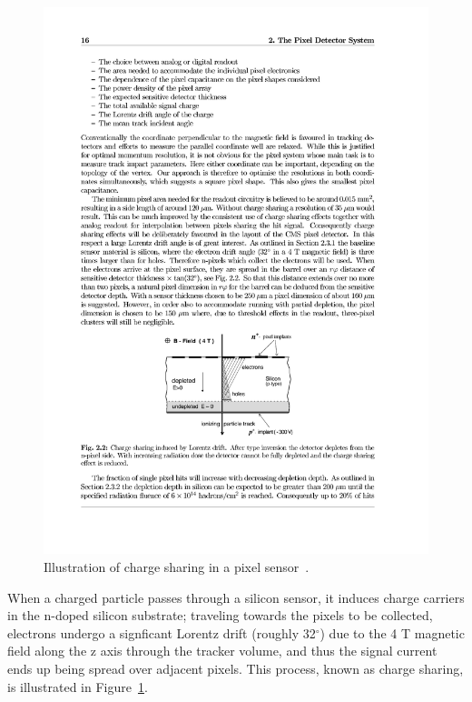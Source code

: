 \begin{figure}[hbtp]
  \begin{center}
    \includegraphics[width=1.24\cmsFigWidth]{figures/cms-pixel-chargesharing}
    \caption{Illustration of charge sharing in a pixel sensor~\cite{Dominguez:1481838}.}
    \label{fig:cms-pixel-chargesharing}
  \end{center}
\end{figure}

When a charged particle passes through a silicon sensor, it induces charge carriers in the n-doped silicon substrate; traveling towards the pixels to be collected, electrons undergo a signficant Lorentz drift (roughly 32$^{\circ}$) due to the 4 T magnetic field along the z axis through the tracker volume, and thus the signal current ends up being spread over adjacent pixels. This process, known as charge sharing, is illustrated in Figure~\ref{fig:cms-pixel-chargesharing}.

